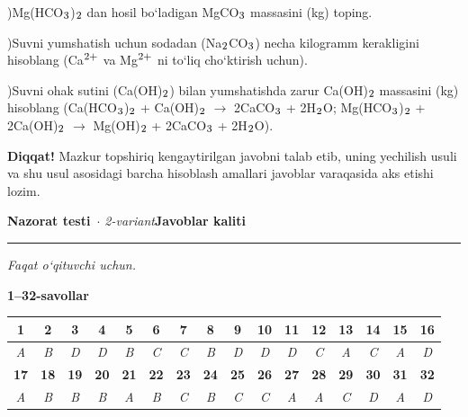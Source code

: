 \documentclass[11pt,a4paper]{article}
\renewcommand{\textsubscript}[1]{\ensuremath{_{\text{\fontsize{8}{8}\selectfont #1}}}}
\renewcommand{\textsuperscript}[1]{\ensuremath{^{\text{\fontsize{8}{8}\selectfont #1}}}}
\newcommand{\qsep}{\par\vspace{1pt}\noindent\rule{0pt}{0.4pt}\par\vspace{5pt}}
\newcommand{\diqqat}[1]{\par\smallskip\noindent\textbf{Diqqat!} #1\par\medskip}
\begin{document}
)Mg(HCO\textsubscript{3})\textsubscript{2} dan hosil bo`ladigan MgCO\textsubscript{3} massasini (kg) toping.\par
{})Suvni yumshatish uchun sodadan (Na\textsubscript{2}CO\textsubscript{3}) necha kilogramm kerakligini hisoblang (Ca\textsuperscript{2+} va Mg\textsuperscript{2+} ni to`liq cho`ktirish uchun).\par
{})Suvni ohak sutini (Ca(OH)\textsubscript{2}) bilan yumshatishda zarur Ca(OH)\textsubscript{2} massasini (kg) hisoblang (Ca(HCO\textsubscript{3})\textsubscript{2} + Ca(OH)\textsubscript{2} $\to$ 2CaCO\textsubscript{3} + 2H\textsubscript{2}O; Mg(HCO\textsubscript{3})\textsubscript{2} + 2Ca(OH)\textsubscript{2} $\to$ Mg(OH)\textsubscript{2} + 2CaCO\textsubscript{3} + 2H\textsubscript{2}O).\par
\diqqat{Mazkur topshiriq kengaytirilgan javobni talab etib, uning yechilish usuli va shu usul asosidagi barcha hisoblash amallari javoblar varaqasida aks etishi lozim.}\qsep
\newpage
\noindent\textbf{\fontsize{13}{15}\selectfont Nazorat testi}\ \textit{$\cdot$ 2-variant}\hfill \textbf{Javoblar kaliti}\par\smallskip\hrule\smallskip
\textit{Faqat o`qituvchi uchun.}\par\medskip
\noindent\textbf{1--32-savollar}\par\smallskip
\noindent\begin{tabular}{|c|c|c|c|c|c|c|c|c|c|c|c|c|c|c|c|}\hline
\textbf{1} & \textbf{2} & \textbf{3} & \textbf{4} & \textbf{5} & \textbf{6} & \textbf{7} & \textbf{8} & \textbf{9} & \textbf{10} & \textbf{11} & \textbf{12} & \textbf{13} & \textbf{14} & \textbf{15} & \textbf{16}\\\hline
\textsl{A} & \textsl{B} & \textsl{D} & \textsl{D} & \textsl{B} & \textsl{C} & \textsl{C} & \textsl{B} & \textsl{D} & \textsl{D} & \textsl{D} & \textsl{C} & \textsl{A} & \textsl{C} & \textsl{A} & \textsl{D}\\\hline
\textbf{17} & \textbf{18} & \textbf{19} & \textbf{20} & \textbf{21} & \textbf{22} & \textbf{23} & \textbf{24} & \textbf{25} & \textbf{26} & \textbf{27} & \textbf{28} & \textbf{29} & \textbf{30} & \textbf{31} & \textbf{32}\\\hline
\textsl{A} & \textsl{B} & \textsl{B} & \textsl{B} & \textsl{A} & \textsl{B} & \textsl{C} & \textsl{B} & \textsl{C} & \textsl{C} & \textsl{A} & \textsl{A} & \textsl{C} & \textsl{D} & \textsl{A} & \textsl{D}\\\hline
\end{tabular}\par\medskip
\end{document}
